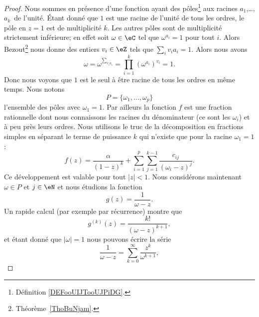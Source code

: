 \begin{proof}
    Nous sommes en présence d'une fonction ayant des pôles\footnote{Définition \ref{DEFooUIJTooUJPiDG}.} aux racines \( a_1\),\ldots, \( a_k\)\ieme\ de l'unité. Étant donné que \( 1\) est une racine de l'unité de tous les ordres, le pôle en \( z=1\) est de multiplicité \( k\). Les autres pôles sont de multiplicité strictement inférieure; en effet soit \( \omega\in \eC\) tel que \( \omega^{a_i}=1\) pour tout \( i\). Alors Bezout\footnote{Théorème~\ref{ThoBuNjam}.} nous donne des entiers \( v_i\in \eZ\) tels que \( \sum_iv_ia_i=1\). Alors nous avons
    \begin{equation}
        \omega=\omega^{\sum_{v_ia_i}}=\prod_{i=1}^k(\omega^{a_i})^{v_i}=1.
    \end{equation}
    Donc nous voyons que \( 1\) est le seul à être racine de tous les ordres en même temps. Nous notons
    \begin{equation}
        P=\{ \omega_1,\ldots, \omega_p \}
    \end{equation}
    l'ensemble des pôles avec \( \omega_1=1\). Par ailleurs la fonction \( f\) est une fraction rationnelle dont nous connaissons les racines du dénominateur (ce sont les \( \omega_i\)) et à peu près leurs ordres. Nous utilisons le truc de la décomposition en fractions simples
    en séparant le terme de puissance \( k\) qui n'existe que pour la racine \( \omega_1=1\) :
    \begin{equation}    \label{EqDLTJaYr}
        f(z)=\frac{ \alpha }{ (1-z)^k }+\sum_{i=1}^p\sum_{j=1}^{k-1}\frac{ c_{ij} }{ (\omega_i-z)^j }.
    \end{equation}
    Ce développement est valable pour tout \( | z |<1\). Nous considérons maintenant \( \omega\in P\) et \( j\in \eN\) et nous étudions la fonction
    \begin{equation}
        g(z)=\frac{1}{ \omega-z }.
    \end{equation}
    Un rapide calcul (par exemple par récurrence) montre que
    \begin{equation}    \label{EqEJLDIFJ2}
        g^{(k)}(z)=\frac{ k! }{ (\omega-z)^{k+1} },
    \end{equation}
    et étant donné que \( | \omega |=1\) nous pouvons écrire la série
    \begin{equation}
        \frac{1}{ \omega-z }=\sum_{k=0}^{\infty}\frac{ z^k }{ \omega^{k+1} },

\end{equation}
\end{proof}
